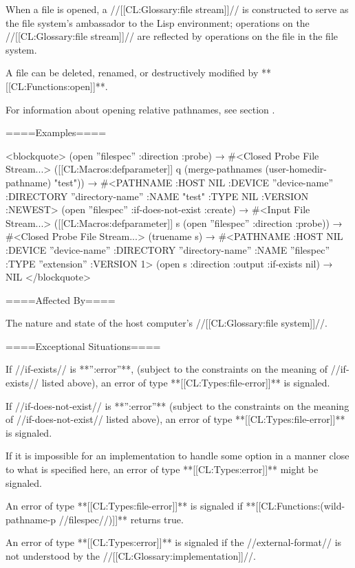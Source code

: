 \endlist

When a file is opened, a //[[CL:Glossary:file stream]]// is constructed to serve as the file system's ambassador to the Lisp environment; operations on the //[[CL:Glossary:file stream]]// are reflected by operations on the file in the file system.

A file can be deleted, renamed, or destructively modified by **[[CL:Functions:open]]**.

For information about opening relative pathnames, see section {\secref\MergingPathnames}.

====Examples====

<blockquote> (open ''filespec'' :direction :probe) → #<Closed Probe File Stream...> ([[CL:Macros:defparameter]] q (merge-pathnames (user-homedir-pathname) "test")) → #<PATHNAME :HOST NIL :DEVICE ''device-name'' :DIRECTORY ''directory-name'' :NAME "test" :TYPE NIL :VERSION :NEWEST> (open ''filespec'' :if-does-not-exist :create) → #<Input File Stream...> ([[CL:Macros:defparameter]] s (open ''filespec'' :direction :probe)) → #<Closed Probe File Stream...> (truename s) → #<PATHNAME :HOST NIL :DEVICE ''device-name'' :DIRECTORY ''directory-name'' :NAME ''filespec'' :TYPE ''extension'' :VERSION 1> (open s :direction :output :if-exists nil) → NIL </blockquote>

====Affected By====

The nature and state of the host computer's //[[CL:Glossary:file system]]//.

====Exceptional Situations====

If //if-exists// is **'':error''**, (subject to the constraints on the meaning of //if-exists// listed above), an error of type **[[CL:Types:file-error]]** is signaled.

If //if-does-not-exist// is **'':error''** (subject to the constraints on the meaning of //if-does-not-exist// listed above), an error of type **[[CL:Types:file-error]]** is signaled.

If it is impossible for an implementation to handle some option in a manner close to what is specified here, an error of type **[[CL:Types:error]]** might be signaled.

An error of type **[[CL:Types:file-error]]** is signaled if **[[CL:Functions:(wild-pathname-p //filespec//)]]** returns true.

An error of type **[[CL:Types:error]]** is signaled if the //external-format// is not understood by the //[[CL:Glossary:implementation]]//.

